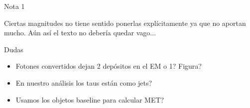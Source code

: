 \vspace{2cm}


{\LARGE Nota 1}

Ciertas magnitudes no tiene sentido ponerlas explícitamente ya que no aportan mucho. Aún así el texto no debería quedar vago...


\vspace{2cm}


{\LARGE Dudas}

\begin{itemize}
	\item Fotones convertidos dejan 2 depósitos en el EM o 1? Figura?
	\item En nuestro análisis los taus están como jets?
	\item Usamos los objetos baseline para calcular MET?
\end{itemize}

